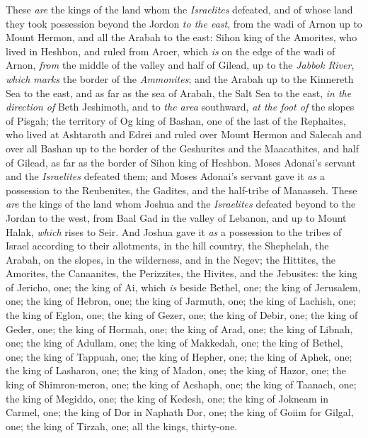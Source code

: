 \begin{biblechapter} %
 These \textit{are} the kings of the land whom the \textit{Israelites} defeated, and of whose land they took possession beyond the Jordon \textit{to the east}, from the wadi of Arnon up to Mount Hermon, and all the Arabah to the east:
\verse Sihon king of the Amorites, who lived in Heshbon, and ruled from Aroer, which \textit{is} on the edge of the wadi of Arnon, \textit{from} the middle of the valley and half of Gilead, up to the \textit{Jabbok River}, \textit{which marks} the border of the \textit{Ammonites};
\verse and the Arabah up to the Kinnereth Sea to the east, and as far as the sea of Arabah, the Salt Sea to the east, \textit{in the direction of} Beth Jeshimoth, and to \textit{the area} southward, \textit{at the foot of} the slopes of Pisgah;
\verse the territory of Og king of Bashan, one of the last of the Rephaites, who lived at Ashtaroth and Edrei
\verse and ruled over Mount Hermon and Salecah and over all Bashan up to the border of the Geshurites and the Maacathites, and half of Gilead, as far as the border of Sihon king of Heshbon.
\verse Moses Adonai’s servant and the \textit{Israelites} defeated them; and Moses Adonai’s servant gave it \textit{as} a possession to the Reubenites, the Gadites, and the half-tribe of Manasseh.
 These \textit{are} the kings of the land whom Joshua and the \textit{Israelites} defeated beyond to the Jordan to the west, from Baal Gad in the valley of Lebanon, and up to Mount Halak, \textit{which} rises to Seir. And Joshua gave it \textit{as} a possession to the tribes of Israel according to their allotments,
\verse in the hill country, the Shephelah, the Arabah, on the slopes, in the wilderness, and in the Negev; the Hittites, the Amorites, the Canaanites, the Perizzites, the Hivites, and the Jebusites:
\verse the king of Jericho, one; the king of Ai, which \textit{is} beside Bethel, one;
\verse the king of Jerusalem, one; the king of Hebron, one;
\verse the king of Jarmuth, one; the king of Lachish, one;
\verse the king of Eglon, one; the king of Gezer, one;
\verse the king of Debir, one; the king of Geder, one;
\verse the king of Hormah, one; the king of Arad, one;
\verse the king of Libnah, one; the king of Adullam, one;
\verse the king of Makkedah, one; the king of Bethel, one;
\verse the king of Tappuah, one; the king of Hepher, one;
\verse the king of Aphek, one; the king of Lasharon, one;
\verse the king of Madon, one; the king of Hazor, one;
\verse the king of Shimron-meron, one; the king of Acshaph, one;
\verse the king of Taanach, one; the king of Megiddo, one;
\verse the king of Kedesh, one; the king of Jokneam in Carmel, one;
\verse the king of Dor in Naphath Dor, one; the king of Goiim for Gilgal, one;
\verse the king of Tirzah, one; all the kings, thirty-one.
\end{biblechapter}

